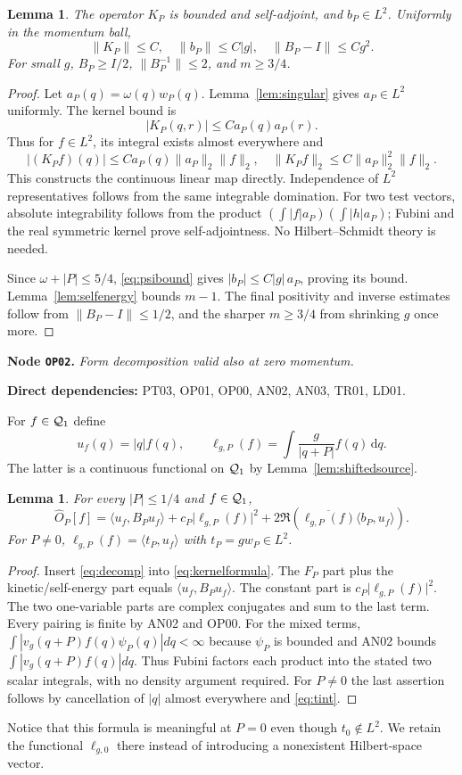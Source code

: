 \documentclass[11pt,a4paper]{article}
\newtheorem{lemma}[theorem]{Lemma}
\theoremstyle{remark}\newtheorem{remark}[theorem]{Remark}
\newcommand{\ip}[2]{\langle #1,#2\rangle}\newcommand{\norm}[1]{\lVert #1\rVert}
\newcommand{\abs}[1]{\lvert #1\rvert}\newcommand{\rankone}[2]{\lvert #1\rangle\langle #2\rvert}
\newcommand{\dd}{\,\mathrm d}\newcommand{\almosteverywhere}{\text{a.e.}}
\newcommand{\node}[3]{\par\Needspace{6\baselineskip}\smallskip\hypertarget{node:#1}{}\label{nodepage:#1}\noindent\textbf{Node \texttt{#1}.} \textit{#2.}\par\noindent\textbf{Direct dependencies:} #3.\par}
\begin{document}
\begin{lemma}\label{lem:boundedkernel}
The operator $K_P$ is bounded and self-adjoint, and $b_P\in L^2$. Uniformly in the momentum ball,
\[
 \norm{K_P}\leq C,\quad\norm{b_P}\leq C\abs g,\quad
 \norm{B_P-I}\leq Cg^2.
\]
For small $g$, $B_P\geq I/2$, $\norm{B_P^{-1}}\leq2$, and $m\geq3/4$.
\end{lemma}
\begin{proof}
Let $a_P(q)=\omega(q)w_P(q)$. Lemma~\ref{lem:singular} gives $a_P\in L^2$ uniformly. The kernel bound is
\[
 \abs{K_P(q,r)}\leq C a_P(q)a_P(r).
\]
Thus for $f\in L^2$, its integral exists almost everywhere and
\[
 \abs{(K_Pf)(q)}\leq C a_P(q)\norm{a_P}_2\norm f_2,
 \quad\norm{K_Pf}_2\leq C\norm{a_P}_2^2\norm f_2.
\]
This constructs the continuous linear map directly. Independence of $L^2$ representatives follows from the same integrable domination. For two test vectors, absolute integrability follows from the product $(\int\abs f a_P)(\int\abs h a_P)$; Fubini and the real symmetric kernel prove self-adjointness. No Hilbert--Schmidt theory is needed.

Since $\omega+\abs P\leq5/4$, \eqref{eq:psibound} gives $\abs{b_P}\leq C\abs g\,a_P$, proving its bound. Lemma~\ref{lem:selfenergy} bounds $m-1$. The final positivity and inverse estimates follow from $\norm{B_P-I}\leq1/2$, and the sharper $m\geq3/4$ from shrinking $g$ once more.
\end{proof}

\node{OP02}{Form decomposition valid also at zero momentum}{PT03, OP01, OP00, AN02, AN03, TR01, LD01}
For $f\in\mathcal Q_1$ define
\[
 u_f(q)=\abs q f(q),\qquad
 \ell_{g,P}(f)=\int\frac g{\abs{q+P}}f(q)\dd q.
\]
The latter is a continuous functional on $\mathcal Q_1$ by Lemma~\ref{lem:shiftedsource}.

\begin{lemma}\label{lem:unnormalizedform}
For every $\abs P\leq1/4$ and $f\in\mathcal Q_1$,
\begin{equation}
 \widehat O_P[f]=\ip{u_f}{B_Pu_f}
       +c_P\abs{\ell_{g,P}(f)}^2
       +2\Re\left(\overline{\ell_{g,P}(f)}\ip{b_P}{u_f}\right).
 \label{eq:unnormalizedform}
\end{equation}
For $P\ne0$, $\ell_{g,P}(f)=\ip{t_P}{u_f}$ with $t_P=g w_P\in L^2$.
\end{lemma}
\begin{proof}
Insert \eqref{eq:decomp} into \eqref{eq:kernelformula}. The $F_P$ part plus the kinetic/self-energy part equals $\ip{u_f}{B_Pu_f}$. The constant part is $c_P\abs{\ell_{g,P}(f)}^2$. The two one-variable parts are complex conjugates and sum to the last term. Every pairing is finite by AN02 and OP00. For the mixed terms, $\int |v_g(q+P)f(q)\psi_P(q)|dq<\infty$ because $\psi_P$ is bounded and AN02 bounds $\int|v_g(q+P)f(q)|dq$. Thus Fubini factors each product into the stated two scalar integrals, with no density argument required. For $P\ne0$ the last assertion follows by cancellation of $\abs q$ almost everywhere and \eqref{eq:tint}.
\end{proof}
Notice that this formula is meaningful at $P=0$ even though $t_0\notin L^2$. We retain the functional $\ell_{g,0}$ there instead of introducing a nonexistent Hilbert-space vector.
\end{document}
